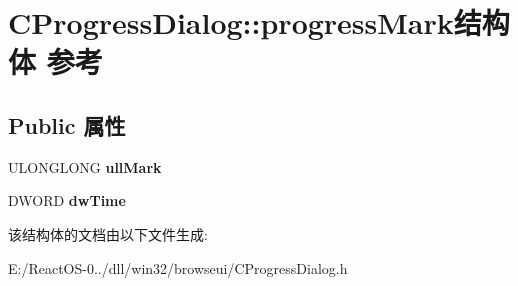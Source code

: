 \hypertarget{struct_c_progress_dialog_1_1progress_mark}{}\section{C\+Progress\+Dialog\+:\+:progress\+Mark结构体 参考}
\label{struct_c_progress_dialog_1_1progress_mark}
\subsection*{Public 属性}
\begin{DoxyCompactItemize}
\item 
\mbox{\label{struct_c_progress_dialog_1_1progress_mark_a95c147055d3ad37ce57a449205737ace}} 
U\+L\+O\+N\+G\+L\+O\+NG {\bfseries ull\+Mark}
\item 
\mbox{\label{struct_c_progress_dialog_1_1progress_mark_a2e426142bea6295e7a3148edc8b73e9c}} 
D\+W\+O\+RD {\bfseries dw\+Time}
\end{DoxyCompactItemize}


该结构体的文档由以下文件生成\+:\begin{DoxyCompactItemize}
\item 
E\+:/\+React\+O\+S-\/0../dll/win32/browseui/C\+Progress\+Dialog.\+h\end{DoxyCompactItemize}
